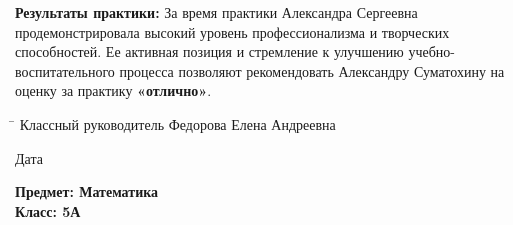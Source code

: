 \documentclass[a4paper,12pt]{article}
\begin{document}
\textbf{Результаты практики:} За время практики Александра Сергеевна продемонстрировала высокий уровень профессионализма и творческих способностей. Ее активная позиция и стремление к улучшению учебно-воспитательного процесса позволяют рекомендовать Александру Суматохину на оценку за практику \textbf{«отлично»}.

\vspace{10mm}

\noindent
\begin{tabbing}
\hspace{5cm} \= \kill
Классный руководитель \> \underline{\hspace{5cm}} Федорова Елена Андреевна
\end{tabbing}
Дата \underline{\hspace{5cm}}

\vspace{5mm}

\noindent
\textbf{Предмет: Математика}\\
\textbf{Класс: 5А}\\
\end{document}
